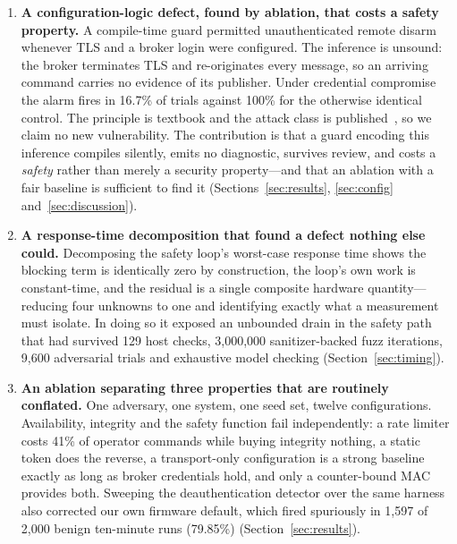 \begin{enumerate}[leftmargin=1.4em,itemsep=0.25em]
\item \textbf{A configuration-logic defect, found by ablation, that costs a safety property.}
A compile-time guard permitted unauthenticated remote disarm whenever TLS and a broker login
were configured. The inference is unsound: the broker terminates TLS and re-originates every
message, so an arriving command carries no evidence of its publisher. Under credential
compromise the alarm fires in 16.7\% of trials against 100\% for the otherwise identical
control. The principle is textbook and the attack class is published~\cite{pirates2024}, so we
claim no new vulnerability. The contribution is that a guard encoding this inference compiles
silently, emits no diagnostic, survives review, and costs a \emph{safety} rather than merely a
security property---and that an ablation with a fair baseline is sufficient to find it
(Sections~\ref{sec:results}, \ref{sec:config} and~\ref{sec:discussion}).

\item \textbf{A response-time decomposition that found a defect nothing else could.}
Decomposing the safety loop's worst-case response time shows the blocking term is identically
zero by construction, the loop's own work is constant-time, and the residual is a single
composite hardware quantity---reducing four unknowns to one and identifying exactly what a
measurement must isolate. In doing so it exposed an unbounded drain in the safety path that had
survived 129 host checks, 3{,}000{,}000 sanitizer-backed fuzz iterations, 9{,}600 adversarial
trials and exhaustive model checking (Section~\ref{sec:timing}).

\item \textbf{An ablation separating three properties that are routinely conflated.} One
adversary, one system, one seed set, twelve configurations. Availability, integrity and the
safety function fail independently: a rate limiter costs 41\% of operator commands while buying
integrity nothing, a static token does the reverse, a transport-only configuration is a strong
baseline exactly as long as broker credentials hold, and only a counter-bound MAC provides
both. Sweeping the deauthentication detector over the same harness also corrected our own
firmware default, which fired spuriously in 1{,}597 of 2{,}000 benign ten-minute runs (79.85\%)
(Section~\ref{sec:results}).


\end{enumerate}
